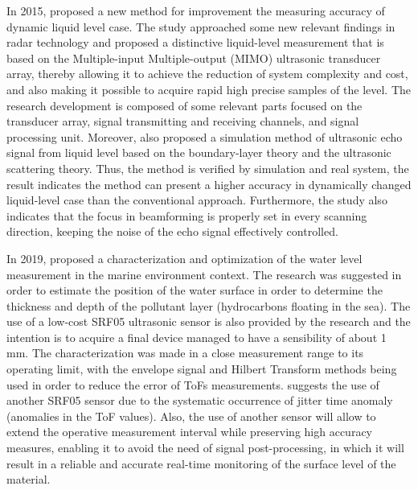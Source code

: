 In 2015, \cite{LI:2015} proposed a new method for improvement the measuring accuracy of dynamic liquid level case. The study approached some new relevant findings in radar technology and proposed a distinctive liquid-level measurement that is based on the Multiple-input Multiple-output (MIMO) ultrasonic transducer array, thereby allowing it to achieve the reduction of system complexity and cost, and also making it possible to acquire rapid high precise samples of the level. The research development is composed of some relevant parts focused on the transducer array, signal transmitting and receiving channels, and signal processing unit. Moreover, \cite{LI:2015} also proposed a simulation method of ultrasonic echo signal from liquid level based on the boundary-layer theory and the ultrasonic scattering theory. Thus, the method is verified by simulation and real system, the result indicates the method can present a higher accuracy in dynamically changed liquid-level case than the conventional approach. Furthermore, the study also indicates that the focus in beamforming is properly set in every scanning direction, keeping the noise of the echo signal effectively controlled.

In 2019, \cite{ROCCHI:2019} proposed a characterization and optimization of the water level measurement in the marine environment context. The research was suggested in order to estimate the position of the water surface in order to determine the thickness and depth of the pollutant layer (hydrocarbons floating in the sea). The use of a low-cost SRF05 ultrasonic sensor is also provided by the research and the intention is to acquire a final device managed to have a sensibility of about 1 mm. The characterization was made in a close measurement range to its operating limit, with the envelope signal and Hilbert Transform methods being used in order to reduce the error of \gls{ToF}s measurements. \cite{ROCCHI:2019} suggests the use of another SRF05 sensor due to the systematic occurrence of jitter time anomaly (anomalies in the \gls{ToF} values). Also, the use of another sensor will allow to extend the operative measurement interval while preserving high accuracy measures, enabling it to avoid the need of signal post-processing, in which it will result in a reliable and accurate real-time monitoring of the surface level of the material. 